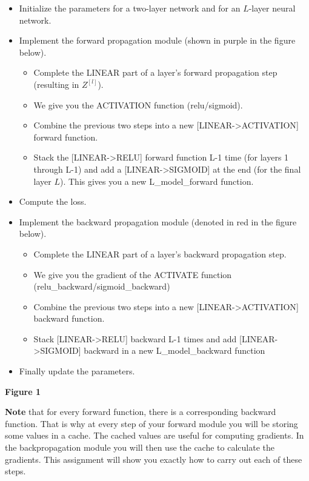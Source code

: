 \documentclass[11pt]{article}
\begin{document}
\begin{itemize}
\itemsep1pt\parskip0pt
\item
  Initialize the parameters for a two-layer network and for an $L$-layer
  neural network.
\item
  Implement the forward propagation module (shown in purple in the
  figure below).

  \begin{itemize}
  \itemsep1pt\parskip0pt
  \item
    Complete the LINEAR part of a layer's forward propagation step
    (resulting in $Z^{[l]}$).
  \item
    We give you the ACTIVATION function (relu/sigmoid).
  \item
    Combine the previous two steps into a new
    {[}LINEAR-\textgreater{}ACTIVATION{]} forward function.
  \item
    Stack the {[}LINEAR-\textgreater{}RELU{]} forward function L-1 time
    (for layers 1 through L-1) and add a
    {[}LINEAR-\textgreater{}SIGMOID{]} at the end (for the final layer
    $L$). This gives you a new L\_model\_forward function.
  \end{itemize}
\item
  Compute the loss.
\item
  Implement the backward propagation module (denoted in red in the
  figure below).

  \begin{itemize}
  \itemsep1pt\parskip0pt
  \item
    Complete the LINEAR part of a layer's backward propagation step.
  \item
    We give you the gradient of the ACTIVATE function
    (relu\_backward/sigmoid\_backward)
  \item
    Combine the previous two steps into a new
    {[}LINEAR-\textgreater{}ACTIVATION{]} backward function.
  \item
    Stack {[}LINEAR-\textgreater{}RELU{]} backward L-1 times and add
    {[}LINEAR-\textgreater{}SIGMOID{]} backward in a new
    L\_model\_backward function
  \end{itemize}
\item
  Finally update the parameters.
\end{itemize}

\textbf{Figure 1}

\textbf{Note} that for every forward function, there is a corresponding
backward function. That is why at every step of your forward module you
will be storing some values in a cache. The cached values are useful for
computing gradients. In the backpropagation module you will then use the
cache to calculate the gradients. This assignment will show you exactly
how to carry out each of these steps.
\end{document}
